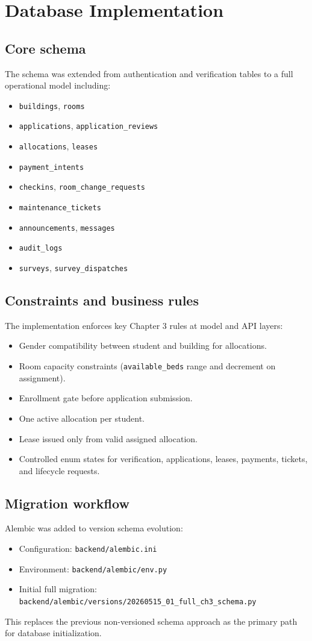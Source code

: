\section{Database Implementation}
\subsection{Core schema}
The schema was extended from authentication and verification tables to a full operational model including:
\begin{itemize}
  \item \texttt{buildings}, \texttt{rooms}
  \item \texttt{applications}, \texttt{application\_reviews}
  \item \texttt{allocations}, \texttt{leases}
  \item \texttt{payment\_intents}
  \item \texttt{checkins}, \texttt{room\_change\_requests}
  \item \texttt{maintenance\_tickets}
  \item \texttt{announcements}, \texttt{messages}
  \item \texttt{audit\_logs}
  \item \texttt{surveys}, \texttt{survey\_dispatches}
\end{itemize}

\subsection{Constraints and business rules}
The implementation enforces key Chapter 3 rules at model and API layers:
\begin{itemize}
  \item Gender compatibility between student and building for allocations.
  \item Room capacity constraints (\texttt{available\_beds} range and decrement on assignment).
  \item Enrollment gate before application submission.
  \item One active allocation per student.
  \item Lease issued only from valid assigned allocation.
  \item Controlled enum states for verification, applications, leases, payments, tickets, and lifecycle requests.
\end{itemize}

\subsection{Migration workflow}
Alembic was added to version schema evolution:
\begin{itemize}
  \item Configuration: \texttt{backend/alembic.ini}
  \item Environment: \texttt{backend/alembic/env.py}
  \item Initial full migration: \texttt{backend/alembic/versions/20260515\_01\_full\_ch3\_schema.py}
\end{itemize}
This replaces the previous non-versioned schema approach as the primary path for database initialization.

